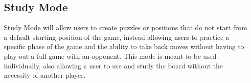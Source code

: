 \documentclass{article}
\begin{document}
\subsection{Study Mode}
Study Mode will allow users to create puzzles or positions that do not start from a default starting position of the game, instead allowing users to practice a specific phase of the game and the ability to take back moves without having to play out a full game with an opponent. This mode is meant to be used individually, also allowing a user to use and study the board without the necessity of another player.
\end{document}
